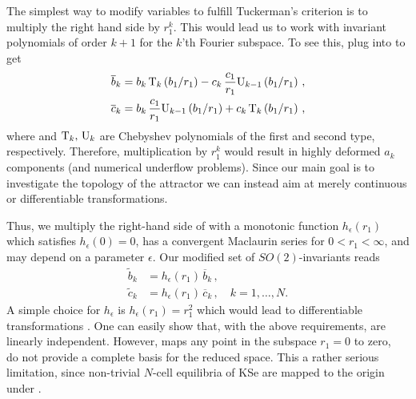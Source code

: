 \documentclass[aip,cha,showpacs,reprint]{revtex4-1} %
\begin{document}
The simplest way to modify variables  to fulfill Tuckerman's
criterion is to multiply the right hand side by $r_1^k$. This would lead us to
work with invariant polynomials of order $k+1$ for the $k$'th Fourier subspace.
To see this, plug  into  to get
\bseq\label{eq:SO2cheb}
  \begin{align}
    \overline{b}_k &=
		    b_k\, \mathrm{T}_k\left(b_1/r_1\right)-
		    c_k\,\frac{c_1}{r_1} \mathrm{U}_{k-1}\left(b_1/r_1\right)\,, \label{eq:SO2cheb1}\\
    \overline{c}_k &=
		    b_k\, \frac{c_1}{r_1} \mathrm{U}_{k-1}\left(b_1/r_1\right)+
		    c_k\,\mathrm{T}_k\left(b_1/r_1\right)\,,  \label{eq:SO2cheb2}
  \end{align}
\eseq
where and $\mathrm{T}_k,\,\mathrm{U}_k$ are Chebyshev polynomials of the first and second type, respectively.
Therefore, multiplication by $r_1^k$ would result in highly deformed $a_k$ components
(and numerical underflow problems). Since our main goal is to investigate the
topology of the attractor we can instead aim at merely continuous or
differentiable transformations.

Thus, we multiply the right-hand side of  with a monotonic function
$h_\epsilon(r_1)$ which satisfies $h_\epsilon(0)=0$,
has a convergent Maclaurin series for $0<r_1<\infty$,
and may depend on a parameter $\epsilon$.
Our modified set of $SO(2)$-invariants reads
\bseq\label{eq:SO2polarCont}
  \begin{align}
    \tilde{b}_k &=
		    h_\epsilon(r_1)\,\overline{b}_k\,, \label{eq:SO2polarCont1}\\
    \tilde{c}_k &=
		    h_\epsilon(r_1)\,\overline{c}_k\,, \quad k=1,\ldots,N.\label{eq:SO2polarCont2}
  \end{align}
\eseq
A simple choice for $h_\epsilon$ is
$h_\epsilon(r_1)=r_1^2$ which would lead to differentiable transformations .
One can easily show that, with the above requirements,
 are linearly independent. However,
 maps any point in the subspace $r_1=0$ to zero, \ie\
 do not provide a complete basis for the reduced space.
This a rather serious limitation, since non-trivial $N$-cell equilibria of
KSe are mapped to the origin under \refeq{eq:SO2polarCont}.
\end{document}
